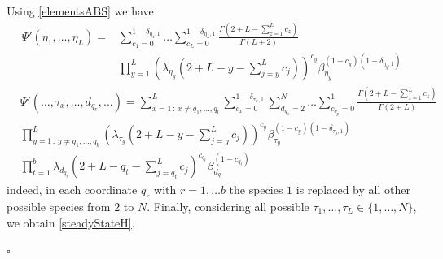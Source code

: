 \documentclass[11pt]{article}
\numberwithin{equation}{section}
\numberwithin{equation}{subsection}
\begin{document}
Using \eqref{elementsABS} we have 
\begin{equation}
  \begin{split}
	\Psi{'}(\eta_{1},\ldots,\eta_{L})=&\sum_{c_{1}=0}^{1-\delta_{\eta_{1},1}}\ldots\sum_{c_{L}=0}^{1-\delta_{\eta_{L},1}}\frac{\Gamma(2+L-\sum_{z=1}^{L}c_{z})}{\Gamma(L+2)}
	\\&
	\prod_{y=1}^{L}\left(\lambda_{\eta_{y}}\left(2+L-y-\sum_{j=y}^{L}c_{j}\right)\right)^{c_{y}}\beta_{\eta_{y}}^{(1-c_{y})(1-\delta_{\eta_{y},1})}
\end{split}
\end{equation}
{\color{blue}
\begin{equation}
    \begin{split}
  &\Psi{'}(\ldots,\tau_{x},\ldots,d_{q_{r}},\ldots)=\sum_{x=1\,:\, x\neq q_{1},\ldots,q_{l}}^{L}\sum_{c_{x}=0}^{1-\delta_{\tau_{x},1}}\sum_{d_{q_{1}}=2}^{N}\ldots\sum_{c_{q_{p}}=0}^{1}\frac{\Gamma(2+L-\sum_{z=1}^{L}c_{z})}{\Gamma(2+L)}
\\&  
\prod_{y=1\,:\, y\neq q_{1},\ldots,q_{b}}^{L}\left(\lambda_{\tau_{y}}\left(2+L-y-\sum_{j=y}^{L}c_{j}\right)\right)^{c_{y}}\beta_{\tau_{y}}^{(1-c_{y})(1-\delta_{\tau_{y},1})}
\\&
  \prod_{t=1}^{b}\lambda_{d_{q_{t}}}\left(2+L-q_{t}-\sum_{j=q_{t}}^{L}c_{j}\right)^{c_{q_{t}}}\beta_{d_{q_{t}}}^{(1-c_{q_{t}})}
    \end{split}
\end{equation}} indeed, in each coordinate $q_{r}$ with $r=1,\ldots b$ the species $1$ is replaced by all other possible species from $2$ to $N$.  Finally, considering all possible $\tau_{1},\ldots,\tau_{L}\in \{1,\ldots,N\}$, we obtain \eqref{steadyStateH}. 
\begin{flushright}
    $\square$
\end{flushright}
\end{document}
